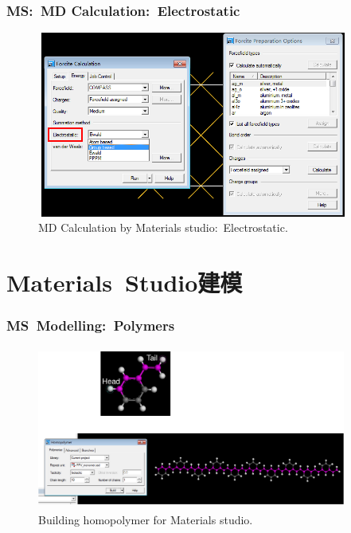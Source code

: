 \frame
{
	\frametitle{\textrm{MS:~MD Calculation:~Electrostatic}}
\begin{figure}[h!]
\centering
\includegraphics[height=2.40in,width=4.05in,viewport=0 0 730 441,clip]{Figures/MS-MD-Electrostatic.png}
\caption{\tiny \textrm{MD Calculation by Materials studio:~Electrostatic.}}%
\label{MS-MD-Dynamics-Electrostatic}
\end{figure}
}

\section{\rm{Materials~Studio}建模}
\frame
{
	\frametitle{\textrm{MS~Modelling:~Polymers}}
\begin{figure}[h!]
\centering
\vspace*{-0.05in}
\includegraphics[height=2.10in,width=4.00in,viewport=0 0 1280 650,clip]{Figures/MS-Building_homopolymer.png}
\caption{\tiny \textrm{Building homopolymer for Materials studio.}}%
\label{MS-Building_homopolymer}
\end{figure}
}

